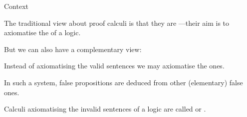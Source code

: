 \begin{frame}{Context
}
\ms


\bi
\item The traditional view about proof calculi is that they are ---their aim is to axiomatise the  of a logic.\pause

\ms
\item But we can also have a complementary view:

\bi
\item Instead of axiomatising the valid sentences we may axiomatise the  ones.\pause

\item In such a system, false propositions are deduced from other (elementary) false ones.\pause

\ei

\ms
\resitem Calculi axiomatising the invalid sentences of a logic are called  or .%


\ei
\end{frame}
